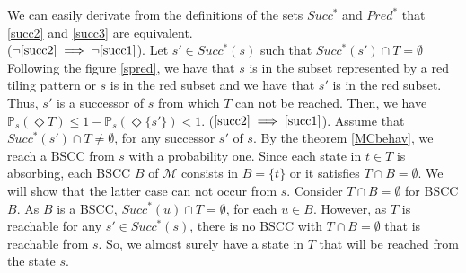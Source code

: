 \begin{proof2}\cite{PMC}
We can easily derivate from the definitions of the sets $Succ^*$ and $Pred^*$ that \ref{succ2} and \ref{succ3} are equivalent. \\
($\neg\ref{succ2}\implies\neg\ref{succ1}$). Let $s' \in Succ^*(s)$ such that $Succ^*(s') \cap T = \emptyset$ Following the figure \ref{spred}, we have that $s$ is in the subset represented by a red tiling pattern or $s$ is in the red subset and we have that $s'$ is in the red subset. Thus, $s'$ is a successor of $s$ from which $T$ can not be reached. Then, we have $\mathbb{P}_s(\Diamond T) \leq 1 - \mathbb{P}_s(\Diamond \{s'\}) < 1$.
($\ref{succ2} \implies \ref{succ1}$). Assume that $Succ^*(s') \cap T \neq \emptyset$, for any successor $s'$ of $s$. By the theorem \ref{MCbehav}, we reach a BSCC from $s$ with a probability one. Since each state in $t \in T$ is absorbing, each BSCC $B$ of $\mathcal{M}$ consists in $B = \{t\}$ or it satisfies $T \cap B = \emptyset$. We will show that the latter case can not occur from $s$.
Consider $T \cap B = \emptyset$ for BSCC $B$.
As $B$ is a BSCC, $Succ^*(u)\cap T = \emptyset$, for each $u \in B$.
However, as $T$ is reachable for any $s' \in Succ^*(s)$, there is no BSCC with $T \cap B = \emptyset$ that is reachable from $s$. So, we almost surely have a state in $T$ that will be reached from the state $s$.
\end{proof2}
\\

